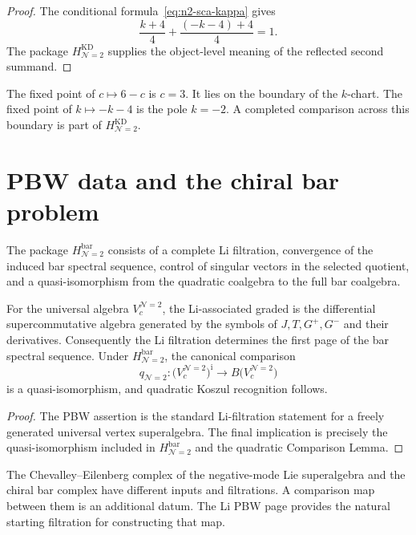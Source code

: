 \begin{proof}
The conditional formula~\eqref{eq:n2-sca-kappa} gives
\[
 \frac{k+4}{4}+\frac{(-k-4)+4}{4}=1.
\]
The package $H_{\mathcal N=2}^{\mathrm{KD}}$ supplies the object-level
meaning of the reflected second summand.
\end{proof}

The fixed point of $c\mapsto6-c$ is $c=3$.  It lies on the boundary
of the $k$-chart.  The fixed point of $k\mapsto-k-4$ is the pole
$k=-2$.  A completed comparison across this boundary is part of
$H_{\mathcal N=2}^{\mathrm{KD}}$.

\section{PBW data and the chiral bar problem}

\begin{definition}[$\mathcal N=2$ bar-collapse package]
\label{def:n2-bar-collapse-package}
The package $H_{\mathcal N=2}^{\mathrm{bar}}$ consists of a complete
Li filtration, convergence of the induced bar spectral sequence,
control of singular vectors in the selected quotient, and a
quasi-isomorphism from the quadratic coalgebra to the full bar
coalgebra.
\end{definition}

\begin{proposition}
\label{prop:n2-koszulness}
For the universal algebra $V_c^{\mathcal N=2}$, the Li-associated
graded is the differential supercommutative algebra generated by the
symbols of $J,T,G^+,G^-$ and their derivatives.  Consequently the Li
filtration determines the first page of the bar spectral sequence.
Under $H_{\mathcal N=2}^{\mathrm{bar}}$, the canonical comparison
\[
 q_{\mathcal N=2}\colon
 \bigl(V_c^{\mathcal N=2}\bigr)^{\mathrm i}
 \longrightarrow B\bigl(V_c^{\mathcal N=2}\bigr)
\]
is a quasi-isomorphism, and quadratic Koszul recognition follows.
\end{proposition}

\begin{proof}
The PBW assertion is the standard Li-filtration statement for a
freely generated universal vertex superalgebra.  The final implication
is precisely the quasi-isomorphism included in
$H_{\mathcal N=2}^{\mathrm{bar}}$ and the quadratic Comparison Lemma.
\end{proof}

\begin{remark}
\label{rem:n2-ce-chiral-gap}
The Chevalley--Eilenberg complex of the negative-mode Lie superalgebra
and the chiral bar complex have different inputs and filtrations.  A
comparison map between them is an additional datum.  The Li PBW page
provides the natural starting filtration for constructing that map.
\end{remark}

